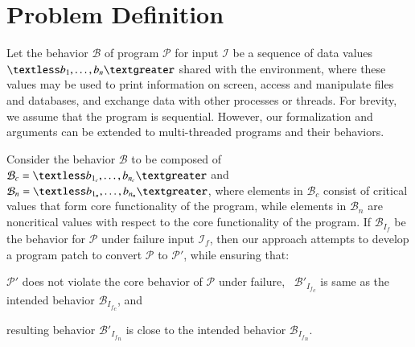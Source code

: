 \section{Problem Definition}
\label{sec:definition}

Let the behavior $\mathcal{B}$ of program $\mathcal{P}$ for input $\mathcal{I}$
be a sequence of data values $\textless b_1, \ldots, b_n \textgreater$ shared
with the environment, where these values may be used to print information on
screen, access and manipulate files and databases, and exchange data with other
processes or threads. For brevity, we assume that the program is sequential.
However, our formalization and arguments can be extended to multi-threaded
programs and their behaviors.

Consider the behavior $\mathcal{B}$ to be composed of $\mathcal{B}_c = \textless
b_{1_c}, \ldots, b_{n_c} \textgreater$ and $\mathcal{B}_n = \textless b_{1_n},
\ldots, b_{n_n} \textgreater$, where elements in $\mathcal{B}_c$ consist of
critical values that form core functionality of the program, while elements in
$\mathcal{B}_n$ are noncritical values with respect to the core functionality of
the program.
%  
% 
%  
% 
If $\mathcal{B}_{I_f}$ be the behavior for $\mathcal{P}$ under failure input
$\mathcal{I}_f$, then our approach attempts to
develop a program patch to convert $\mathcal{P}$ to $\mathcal{P}'$, while
ensuring that:
\begin{mybullet}
 \item $\mathcal{P}'$ does not violate the core behavior of $\mathcal{P}$ under
failure, \ie\ $\mathcal{B}'_{{I_f}_c}$ is same as the intended behavior
$\mathcal{B}_{{I_f}_c}$, and
 \item resulting behavior $\mathcal{B}'_{{I_f}_n}$ is close to the intended
behavior $\mathcal{B}_{{I_f}_n}$.
\end{mybullet}

